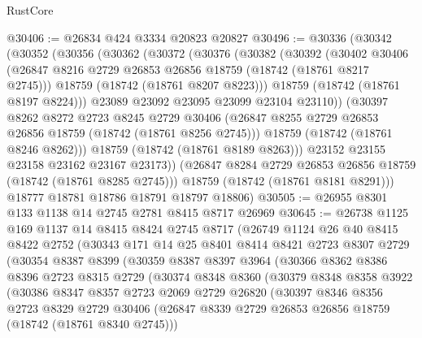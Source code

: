\begin{lexlean}{RustCore}
\begin{coremodule}
@30406 := @26834 @424 @3334 @20823 @20827
@30496 := @30336
    (@30342
      (@30352
        (@30356
          (@30362
            (@30372
              (@30376
                (@30382
                  (@30392
                    (@30402
                      @30406
                      (@26847 @8216 @2729 @26853 @26856 @18759 (@18742 (@18761 @8217 @2745)))
                      @18759
                      (@18742 (@18761 @8207 @8223)))
                    @18759
                    (@18742 (@18761 @8197 @8224)))
                  @23089
                  @23092
                  @23095
                  @23099
                  @23104
                  @23110))
              (@30397
                @8262
                @8272
                @2723
                @8245
                @2729
                @30406
                (@26847 @8255 @2729 @26853 @26856 @18759 (@18742 (@18761 @8256 @2745)))
                @18759
                (@18742 (@18761 @8246 @8262)))
              @18759
              (@18742 (@18761 @8189 @8263)))
            @23152
            @23155
            @23158
            @23162
            @23167
            @23173))
        (@26847 @8284 @2729 @26853 @26856 @18759 (@18742 (@18761 @8285 @2745)))
        @18759
        (@18742 (@18761 @8181 @8291)))
      @18777
      @18781
      @18786
      @18791
      @18797
      @18806)
@30505 := @26955 @8301 @133 @1138 @14 @2745 @2781 @8415 @8717 @26969
@30645 := @26738
    @1125
    @169
    @1137
    @14
    @8415
    @8424
    @2745
    @8717
    (@26749
      @1124
      @26
      @40
      @8415
      @8422
      @2752
      (@30343
        @171
        @14
        @25
        @8401
        @8414
        @8421
        @2723
        @8307
        @2729
        (@30354
          @8387
          @8399
          (@30359
            @8387
            @8397
            @3964
            (@30366
              @8362
              @8386
              @8396
              @2723
              @8315
              @2729
              (@30374
                @8348
                @8360
                (@30379
                  @8348
                  @8358
                  @3922
                  (@30386
                    @8347
                    @8357
                    @2723
                    @2069
                    @2729
                    @26820
                    (@30397
                      @8346
                      @8356
                      @2723
                      @8329
                      @2729
                      @30406
                      (@26847 @8339 @2729 @26853 @26856 @18759 (@18742 (@18761 @8340 @2745)))

\end{coremodule}
\end{lexlean}
